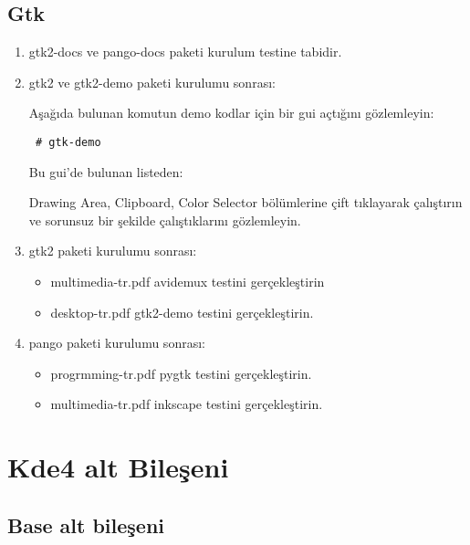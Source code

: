 \documentclass[a4paper,10pt]{article}
\begin{document}
\subsection*{Gtk}
\begin{enumerate}
 \item gtk2-docs ve pango-docs paketi kurulum testine tabidir.
 \item gtk2 ve gtk2-demo paketi kurulumu sonrası: 

Aşağıda bulunan komutun demo kodlar için bir gui açtığını gözlemleyin:
\begin{verbatim}
 # gtk-demo
\end{verbatim}

Bu gui'de bulunan listeden:

Drawing Area, Clipboard, Color Selector bölümlerine çift tıklayarak çalıştırın ve sorunsuz bir şekilde çalıştıklarını gözlemleyin.

\item gtk2 paketi kurulumu sonrası: 
\begin{itemize}
 \item multimedia-tr.pdf avidemux testini gerçekleştirin
\item desktop-tr.pdf gtk2-demo testini gerçekleştirin.
\end{itemize}
\item pango paketi kurulumu sonrası: 
\begin{itemize}
 \item progrmming-tr.pdf pygtk testini gerçekleştirin.
 \item multimedia-tr.pdf inkscape testini gerçekleştirin.
\end{itemize}

\end{enumerate}

\section{Kde4 alt Bileşeni}
\subsection*{Base alt bileşeni}
\end{document}
